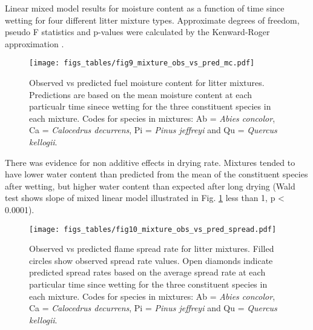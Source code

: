 \documentclass[fire,article,submit,moreauthors,pdftex]{Definitions/mdpi}
\begin{document}
\begin{table}[H]
  \caption{Linear mixed model results for moisture content as a function of time since
    wetting for four different litter mixture types. Approximate degrees of freedom, pseudo F statistics and p-values
    were calculated by the Kenward-Roger approximation
    \cite{Kenward_Roger-1997}.}
  \label{tab:mixtures_drydown}
\centering

\end{table}




\begin{figure}[H]
  \centering
\texttt{[image: figs\_tables/fig9\_mixture\_obs\_vs\_pred\_mc.pdf]}
\caption{Observed vs predicted fuel moisture content for litter mixtures. Predictions are based on the mean moisture content at each particualr time sinece wetting for the three constituent species in each mixture.  Codes for species in mixtures: Ab = \emph{Abies concolor}, Ca = \emph{Calocedrus decurrens}, Pi = \emph{Pinus jeffreyi} and Qu = \emph{Quercus kellogii}.}
  \label{fig:mixture_obs_pred_mc}
\end{figure}

There was evidence for non additive effects in drying rate. Mixtures tended to have lower water content than predicted from the mean of the constituent species after wetting, but higher water content than expected after long drying (Wald test shows slope of mixed linear model illustrated in Fig. \ref{fig:mixture_obs_pred_mc} less than 1, p < 0.0001).


\begin{figure}[H]
  \centering
\texttt{[image: figs\_tables/fig10\_mixture\_obs\_vs\_pred\_spread.pdf]}
\caption{Observed vs predicted flame spread rate for litter mixtures. Filled circles show observed spread rate values. Open diamonds indicate predicted spread rates based on the average spread rate at each particular time since wetting for the three constituent species in each mixture. Codes for species in mixtures: Ab = \emph{Abies concolor}, Ca = \emph{Calocedrus decurrens}, Pi = \emph{Pinus jeffreyi} and Qu = \emph{Quercus kellogii}.}
  \label{fig:mixture_obs_pred_spread}
\end{figure}
\end{document}
